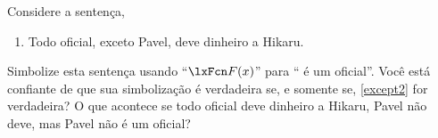 
\problempart Considere a sentença,
\begin{enumerate}[start=19,ref=\arabic*]
\item\label{except2} Todo oficial, exceto Pavel, deve dinheiro a Hikaru.
\end{enumerate}
Simbolize esta sentença usando \textquotedblleft $\atom{F}{x}$\textquotedblright{} para \textquotedblleft {} é um oficial\textquotedblright{}. Você está confiante de que sua simbolização é verdadeira se, e somente se, \cref*{except2} for verdadeira? O que acontece se todo oficial deve dinheiro a Hikaru, Pavel não deve, mas Pavel não é um oficial? 

